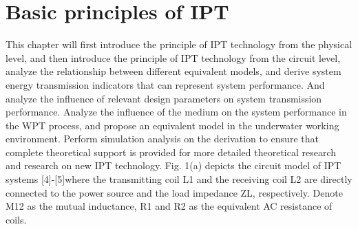\chapter{Basic principles of IPT}
This chapter will first introduce the principle of IPT technology from the physical level, and then introduce the principle of IPT technology from the circuit level, analyze the relationship between different equivalent models, and derive system energy transmission indicators that can represent system performance. And analyze the influence of relevant design parameters on system transmission performance. Analyze the influence of the medium on the system performance in the WPT process, and propose an equivalent model in the underwater working environment. Perform simulation analysis on the derivation to ensure that complete theoretical support is provided for more detailed theoretical research and research on new IPT technology.
Fig. 1(a) depicts the circuit model of IPT systems [4]-[5]where the transmitting coil L1 and the receiving coil L2 are
directly connected to the power source and the load impedance
ZL, respectively. Denote M12 as the mutual inductance, R1 and
R2 as the equivalent AC resistance of coils.

